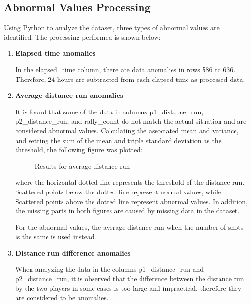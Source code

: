 \documentclass[12pt]{article}  %
\begin{document}
\subsection{Abnormal Values Processing}
Using Python to analyze the dataset, three types of abnormal values are identified. The processing performed is shown below:
\begin{enumerate}[\bfseries 1.]
	\setlength{\parsep}{0ex} %
	\setlength{\topsep}{0.5pt} %
	\setlength{\itemsep}{0.5pt} %
	\item \textbf{Elapsed time anomalies}
	
	In the elapsed\_time column, there are data anomalies in rows 586 to 636. Therefore, 24 hours are subtracted from each elapsed time as processed data.

	\item \textbf{Average distance run anomalies}
	
	It is found that some of the data in columns p1\_distance\_run, p2\_distance\_run, and rally\_count do not match the actual situation and are considered abnormal values. Calculating the associated mean and variance, and setting the sum of the mean and triple standard deviation as the threshold, the following figure was plotted:
	\begin{figure}[H]
		\centering
		
		\hfill 
		
		\caption{Results for average distance run}
		\label{pic2and3}
	\end{figure}
	\vspace{-0.5cm}
	
	where the horizontal dotted line represents the threshold of the distance run. Scattered points below the dotted line represent normal values, while Scattered points above the dotted line represent abnormal values. In addition, the missing parts in both figures are caused by missing data in the dataset.
	
	For the abnormal values, the average distance run when the number of shots is the same is used instead.
	
	\item \textbf{Distance run difference anomalies}
	
	When analyzing the data in the columns p1\_distance\_run and p2\_distance\_run, it is observed that the difference between the distance run by the two players in some cases is too large and impractical, therefore they are considered to be anomalies.
	

\end{enumerate}
\end{document}

